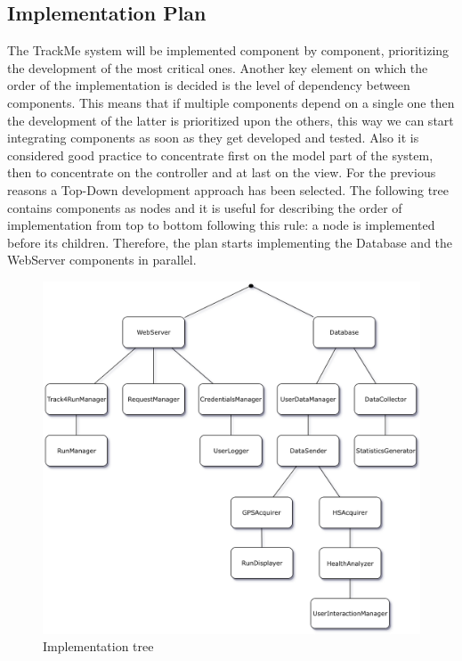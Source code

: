 \subsection{Implementation Plan}
The TrackMe system will be implemented component by component, prioritizing the development of the most critical ones. Another key element on which the order of the implementation is decided is the level of dependency between components. This means that if multiple components depend on a single one then the development of the latter is prioritized upon the others, this way we can start integrating components as soon as they get developed and tested. Also it is considered good practice to concentrate first on the model part of the system, then to concentrate on the controller and at last on the view. For the previous reasons a Top-Down development approach has been selected.
\medbreak
\noindent
The following tree contains components as nodes and it is useful for describing the order of implementation from top to bottom following this rule: a node is implemented before its children. Therefore, the plan starts implementing the Database and the WebServer components in parallel.

\begin{figure}[H]
\centering
\includegraphics[scale=0.6]{Images/ImplementationPlan.png}
\caption{Implementation tree}
\end{figure}


